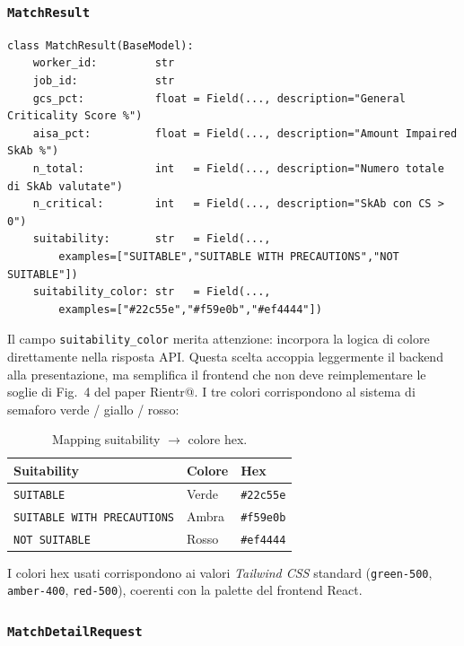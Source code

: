 \documentclass[a4paper,12pt]{article}
\begin{document}
\subsubsection{\texttt{MatchResult}}

\begin{lstlisting}[caption={\texttt{MatchResult} --- coppia (worker, job) con punteggi.}]
class MatchResult(BaseModel):
    worker_id:         str
    job_id:            str
    gcs_pct:           float = Field(..., description="General Criticality Score %")
    aisa_pct:          float = Field(..., description="Amount Impaired SkAb %")
    n_total:           int   = Field(..., description="Numero totale di SkAb valutate")
    n_critical:        int   = Field(..., description="SkAb con CS > 0")
    suitability:       str   = Field(...,
        examples=["SUITABLE","SUITABLE WITH PRECAUTIONS","NOT SUITABLE"])
    suitability_color: str   = Field(...,
        examples=["#22c55e","#f59e0b","#ef4444"])
\end{lstlisting}

\noindent Il campo \texttt{suitability\_color} merita attenzione: incorpora la
logica di colore direttamente nella risposta API. Questa scelta
accoppia leggermente il backend alla presentazione, ma semplifica il
frontend che non deve reimplementare le soglie di Fig.~4 del paper
Rientr@. I tre colori corrispondono al sistema di semaforo verde /
giallo / rosso:

\begin{table}[H]
\centering
\caption{Mapping suitability $\rightarrow$ colore hex.}
\begin{tabular}{L{5.5cm} C{3cm} C{3cm}}
\toprule
\textbf{Suitability} & \textbf{Colore} & \textbf{Hex} \\
\midrule
\texttt{SUITABLE} & Verde & \texttt{\#22c55e} \\
\texttt{SUITABLE WITH PRECAUTIONS} & Ambra & \texttt{\#f59e0b} \\
\texttt{NOT SUITABLE} & Rosso & \texttt{\#ef4444} \\
\bottomrule
\end{tabular}
\end{table}

I colori hex usati corrispondono ai valori \textit{Tailwind CSS} standard
(\texttt{green-500}, \texttt{amber-400}, \texttt{red-500}), coerenti
con la palette del frontend React.

\subsubsection{\texttt{MatchDetailRequest}}
\end{document}
